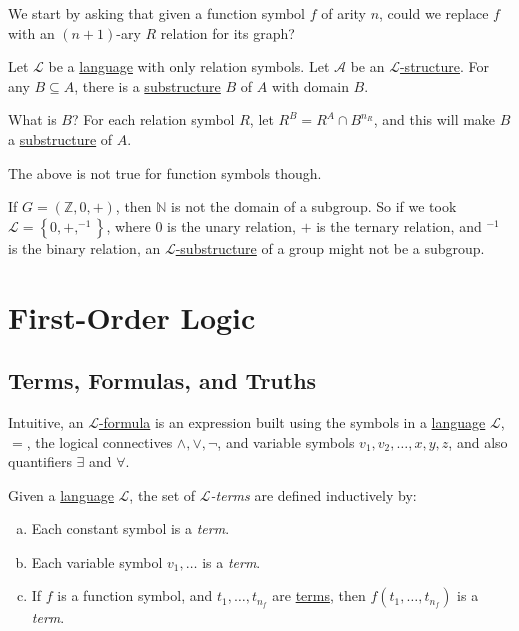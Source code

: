 We start by asking that given a function symbol \(f\) of arity \(n\), could we replace \(f\) with an \((n+1)\)-ary \(R\) relation for its graph?

\begin{eg}
	Let \(\mathcal{L} \) be a \hyperref[def:language]{language} with only relation symbols. Let \(\mathcal{A} \) be an \hyperref[def:structure]{\(\mathcal{L} \)-structure}. For any \(B \subseteq A\), there is a \hyperref[def:substructure]{substructure} \(B\) of \(A\) with domain \(B\).

	What is \(B\)? For each relation symbol \(R\), let \(R^B=R^A \cap B^{n_R}\), and this will make \(B\) a \hyperref[def:substructure]{substructure} of \(A\).
\end{eg}

The above is not true for function symbols though.

\begin{eg}
	If \(G=(\mathbb{Z} , 0, +)\), then \(\mathbb{N} \) is not the domain of a subgroup. So if we took \(\mathcal{L} =\left\{ 0, +, ^{-1}  \right\} \), where \(0\) is the unary relation, \(+\) is the ternary relation, and \(^{-1} \) is the binary relation, an \hyperref[def:substructure]{\(\mathcal{L} \)-substructure} of a group might not be a subgroup.
\end{eg}

\section{First-Order Logic}
\subsection{Terms, Formulas, and Truths}
Intuitive, an \hyperref[def:formula]{\(\mathcal{L} \)-formula} is an expression built using the symbols in a \hyperref[def:language]{language} \(\mathcal{L} \), \(=\), the logical connectives \(\land, \lor, \lnot\), and variable symbols \(v_1, v_2, \ldots , x, y, z\), and also quantifiers \(\exists \) and \(\forall \).

\begin{definition}[Term]\label{def:term}
	Given a \hyperref[def:language]{language} \(\mathcal{L} \), the set of \emph{\(\mathcal{L} \)-terms} are defined inductively by:
	\begin{enumerate}[(a)]
		\item Each constant symbol is a \emph{term}.
		\item Each variable symbol \(v_1, \ldots \) is a \emph{term}.
		\item If \(f\) is a function symbol, and \(t_1, \ldots , t_{n_f}\) are \hyperref[def:term]{terms}, then \(f(t_1, \ldots , t_{n_f})\) is a \emph{term}.
	\end{enumerate}
\end{definition}

